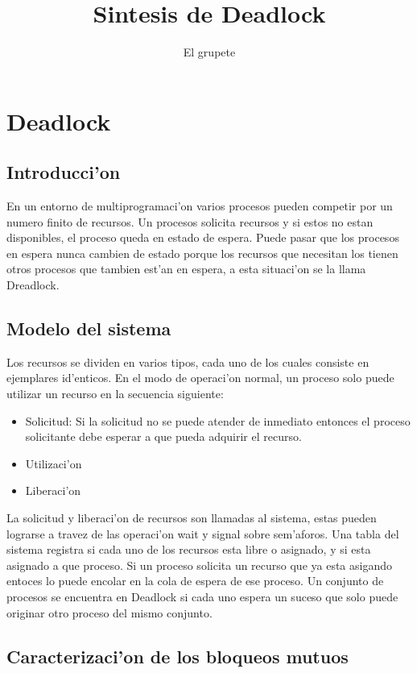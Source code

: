 \documentclass[a4paper,10pt]{article}
\title{Sintesis de Deadlock}
\author{El grupete}
\begin{document}
\maketitle


\section{Deadlock}

\subsection{Introducci'on}
En un entorno de multiprogramaci'on varios procesos pueden competir por un numero finito de recursos. Un procesos solicita recursos y si estos no estan disponibles, el proceso queda en estado de espera. Puede pasar que los procesos en espera nunca cambien de estado porque los recursos que necesitan los tienen otros procesos que tambien est'an en espera, a esta situaci'on se la llama Dreadlock.

\subsection{Modelo del sistema}
Los recursos se dividen en varios tipos, cada uno de los cuales consiste en ejemplares id'enticos. 
En el modo de operaci'on normal, un proceso solo puede utilizar un recurso en la secuencia siguiente:
\begin{itemize}
 \item Solicitud: Si la solicitud no se puede atender de inmediato entonces el proceso solicitante debe esperar a que pueda adquirir el recurso.
 \item Utilizaci'on
 \item Liberaci'on
\end{itemize}
La solicitud y liberaci'on de recursos son llamadas al sistema, estas pueden lograrse a travez de las operaci'on wait y signal sobre sem'aforos.
Una tabla del sistema registra si cada uno de los recursos esta libre o asignado, y si esta asignado a que proceso. Si un proceso solicita un recurso que ya esta asigando entoces lo puede encolar en la cola de espera de ese proceso.
Un conjunto de procesos se encuentra en Deadlock si cada uno espera un suceso que solo puede originar otro proceso del mismo conjunto.

\subsection{Caracterizaci'on de los bloqueos mutuos}
\end{document}
